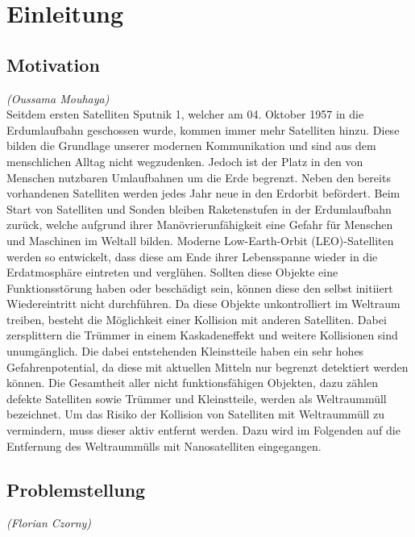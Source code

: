 \chapter{Einleitung}
		\section{Motivation}
	\hfill\emph{(Oussama Mouhaya)}	\\
Seitdem ersten Satelliten Sputnik \num{1}, welcher am 04. Oktober 1957 in die Erdumlaufbahn geschossen wurde, kommen immer mehr Satelliten hinzu. Diese bilden die Grundlage unserer modernen Kommunikation und sind aus dem menschlichen Alltag nicht wegzudenken. Jedoch ist der Platz in den von Menschen nutzbaren Umlaufbahnen um die Erde begrenzt. Neben den bereits vorhandenen Satelliten werden jedes Jahr neue in den Erdorbit befördert. Beim Start von Satelliten und Sonden bleiben Raketenstufen in der Erdumlaufbahn zurück, welche aufgrund ihrer Manövrierunfähigkeit eine Gefahr für Menschen und Maschinen im Weltall bilden. Moderne Low-Earth-Orbit (LEO)-Satelliten werden so entwickelt, dass diese am Ende ihrer Lebensspanne wieder in die Erdatmosphäre eintreten und verglühen. Sollten diese Objekte eine Funktionsstörung haben oder beschädigt sein, können diese den selbst initiiert Wiedereintritt nicht durchführen. Da diese Objekte unkontrolliert im Weltraum treiben, besteht die Möglichkeit einer Kollision mit anderen Satelliten. Dabei zersplittern die Trümmer in einem Kaskadeneffekt und weitere Kollisionen sind unumgänglich. Die dabei entstehenden Kleinstteile haben ein sehr hohes Gefahrenpotential, da diese mit aktuellen Mitteln nur begrenzt detektiert werden können. Die Gesamtheit aller nicht funktionsfähigen Objekten, dazu zählen defekte Satelliten sowie Trümmer und Kleinstteile, werden als Weltraummüll bezeichnet. Um das Risiko der Kollision von Satelliten mit Weltraummüll zu vermindern, muss dieser aktiv entfernt werden. Dazu wird im Folgenden auf die Entfernung des Weltraummülls mit Nanosatelliten eingegangen.

		\section{Problemstellung}
		\hfill\emph{(Florian Czorny)}\\
		
